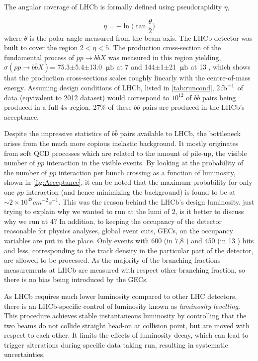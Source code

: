 The angular coverage of \Gls{LHCb} is formally defined using pseudorapidity $\eta$, 

\begin{equation}
	\eta = -\ln \Big(\tan\frac{\theta}{2}\Big)
\end{equation}	
where $\theta$ is the polar angle measured from the beam axis. The \Gls{LHCb} detector was built to cover the region $2<\eta<5$. The production cross-section of the fundamental process of $pp\rightarrow b\bar{b}X$ was measured in this region yielding, $\sigma (pp\rightarrow b\bar{b}X)$= 75.3$\pm$5.4$\pm$13.0 ${\rm \,\upmu b}$ at 7 \tev \cite{LHCb-PAPER-2010-002} and 144$\pm$1$\pm$21 ${\rm \,\upmu b}$ at 13 \tev \cite{LHCb-PAPER-2016-031}, which shows that the production cross-sections scales roughly linearly with the centre-of-mass energy. Assuming design conditions of \gls{LHCb}, listed in \autoref{tab:runcond}, 2$\mbox{\,fb}^{-1}$ of data (eqvivalent to 2012 dataset) would correspond to $10^{12}$ of $b\bar{b}$ pairs being produced in a full 4$\pi$ region. 27\% of these $b\bar{b}$ pairs are produced in the LHCb's acceptance. 


Despite the impressive statistics of $b\bar{b}$ pairs available to \Gls{LHCb}, the bottleneck arises from the much more copious inelastic background. It mostly originates from soft QCD processes which are related to the amount of pile-up, the visible number of $pp$ interaction in the visible events. By looking at the probability of the number of $pp$ interaction per bunch crossing as a function of luminosity, shown in \autoref{fig:Acceptance}, it can be noted that the maximum probability for only one $pp$ interaction (and hence minimizing the background) is found to be at $\sim 2 \times10^{32} cm^{-2} s^{-1}$.  This was the reason behind the \gls{LHCb}'s design luminosity.\color{red} just trying to explain why we wanted to run at the lumi of 2, is it better to discuss why we run at 4? \color{black}In addition, to keeping the occupancy of the detector reasonable for physics analyses, global event cuts, GECs, on the occupancy variables are put in the place. Only events with 600 (in 7,8 \tev) and 450 (in 13 \tev) hits and less, corresponding to the track density in the particular part of the detector, are allowed to be processed.
As the majority of the branching fractions measurements at \gls{LHCb} are measured with respect other branching fraction, so there is no bias being introduced by the GECs. 

As \Gls{LHCb} requires much lower luminosity compared to other \gls{LHC} detectors, there is an LHCb-specific control of luminosity known as \textit{luminosity levelling}. This procedure achieves stable instantaneous luminosity by controlling that the two beams do not collide straight head-on at collision point, but are moved with respect to each other. It limits the effects of luminosity decay, which can lead to trigger alterations during specific data taking run, resulting in systematic uncertainties.


